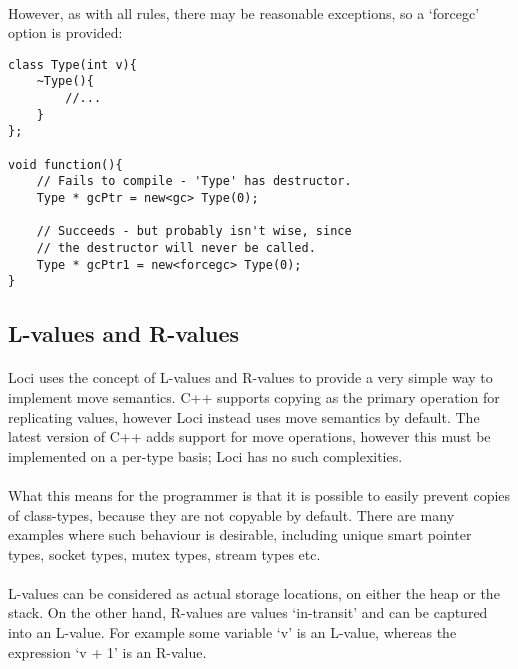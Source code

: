 \documentclass[12pt,twoside,notitlepage]{report}
\begin{document}
\paragraph{}
However, as with all rules, there may be reasonable exceptions, so a `forcegc' option is provided:


\begin{lstlisting}
class Type(int v){
	~Type(){
		//...
	}
};

void function(){
	// Fails to compile - 'Type' has destructor.
	Type * gcPtr = new<gc> Type(0);
	
	// Succeeds - but probably isn't wise, since 
	// the destructor will never be called.
	Type * gcPtr1 = new<forcegc> Type(0);
}
\end{lstlisting}


\clearpage

\subsection{L-values and R-values}

\paragraph{}
Loci uses the concept of L-values and R-values to provide a very simple way to implement move semantics. C++ supports copying as the primary operation for replicating values, however Loci instead uses move semantics by default. The latest version of C++ adds support for move operations, however this must be implemented on a per-type basis; Loci has no such complexities.

\paragraph{}
What this means for the programmer is that it is possible to easily prevent copies of class-types, because they are not copyable by default. There are many examples where such behaviour is desirable, including unique smart pointer types, socket types, mutex types, stream types etc.

\paragraph{}
L-values can be considered as actual storage locations, on either the heap or the stack. On the other hand, R-values are values `in-transit' and can be captured into an L-value. For example some variable `v' is an L-value, whereas the expression `v + 1' is an R-value.
\end{document}
